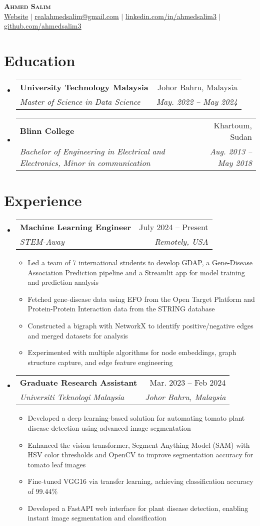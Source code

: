 \documentclass[letterpaper,11pt]{article}
\makeatletter
\newcommand{\resumeItem}[1]{
  \item\small{
    {#1 \vspace{-2pt}}
  }
}
\newcommand{\resumeSubheading}[4]{
  \vspace{-2pt}\item
    \begin{tabular*}{0.97\textwidth}[t]{l@{\extracolsep{\fill}}r}
      \textbf{#1} & #2 \\
      \textit{\small#3} & \textit{\small #4} \\
    \end{tabular*}\vspace{-7pt}
}
\newcommand{\resumeSubHeadingListStart}{\begin{itemize}[leftmargin=0.15in, label={}]}
\newcommand{\resumeSubHeadingListEnd}{\end{itemize}}
\newcommand{\resumeItemListStart}{\begin{itemize}}
\newcommand{\resumeItemListEnd}{\end{itemize}\vspace{-5pt}}
\makeatother
\begin{document}

\begin{center}
    \textbf{\Huge \scshape Ahmed Salim} \\ \vspace{1pt}
    \href{https://ahmedsalim3.github.io/}{\underline{Website}} $|$ \href{mailto:realahmedsalim@gmail.com}{\underline{realahmedsalim@gmail.com}} $|$ 
    \href{https://linkedin.com/in/ahmedsalim3}{\underline{linkedin.com/in/ahmedsalim3}} $|$
    \href{https://github.com/ahmedsalim3}{\underline{github.com/ahmedsalim3}}
\end{center}

\section{Education}
  \resumeSubHeadingListStart
    \resumeSubheading
      {University Technology Malaysia}{Johor Bahru, Malaysia}
      {Master of Science in Data Science}{May. 2022 -- May 2024}
    \resumeSubheading
      {Blinn College}{Khartoum, Sudan}
      {Bachelor of Engineering in Electrical and Electronics, Minor in communication}{Aug. 2013 -- May 2018}
  \resumeSubHeadingListEnd

\section{Experience}
  \resumeSubHeadingListStart
      \resumeSubheading
      {Machine Learning Engineer}{July 2024 -- Present}      
      {STEM-Away}{Remotely, USA}
      \resumeItemListStart
        \resumeItem{Led a team of 7 international students to develop GDAP, a Gene-Disease Association Prediction pipeline and a Streamlit app for model training and prediction analysis}
        \resumeItem{Fetched gene-disease data using EFO from the Open Target Platform and Protein-Protein Interaction data from the STRING database}
        \resumeItem{Constructed a bigraph with NetworkX to identify positive/negative edges and merged datasets for analysis}
        \resumeItem{Experimented with multiple algorithms for node embeddings, graph structure capture, and edge feature engineering}
      \resumeItemListEnd

    \resumeSubheading
      {Graduate Research Assistant}{Mar. 2023 -- Feb 2024}
      {Universiti Teknologi Malaysia}{Johor Bahru, Malaysia}
      \resumeItemListStart
        \resumeItem{Developed a deep learning-based solution for automating tomato plant disease detection using advanced image segmentation}
        \resumeItem{Enhanced the vision transformer, Segment Anything Model (SAM) with HSV color thresholds and OpenCV to improve segmentation accuracy for tomato leaf images}
        \resumeItem{Fine-tuned VGG16 via transfer learning, achieving classification accuracy of 99.44\%}
        \resumeItem{Developed a FastAPI web interface for plant disease detection, enabling instant image segmentation and classification}
      \resumeItemListEnd
  \resumeSubHeadingListEnd
\end{document}

